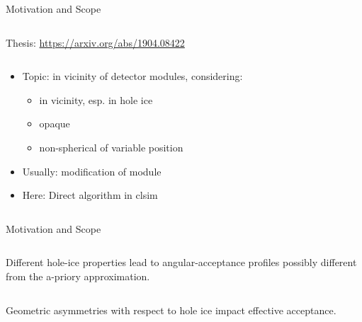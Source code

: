 
\begin{frame}[fragile]{Motivation and Scope}
  \begin{column}{0.6\textwidth}

    \vspace{1cm}
    Thesis: \url{https://arxiv.org/abs/1904.08422}
  \end{column}
  \begin{column}{0.4\textwidth}
    \begin{itemize}
      \item Topic:  in vicinity of detector modules, considering:
      \begin{itemize}
        \item {} in vicinity, esp. in hole ice
        \item opaque 
        \item non-spherical  of variable position
      \end{itemize}
      \item Usually:  modification of module 
      \item Here: Direct  algorithm in clsim
    \end{itemize}

    \vspace{2cm}

  \end{column}
\end{frame}

\begin{frame}[fragile]{Motivation and Scope}
  \begin{column}{0.5\textwidth}
    \vspace*{10mm} 
    
    \vspace*{5mm} Different hole-ice properties lead to angular-acceptance profiles possibly different from the a-priory approximation.

  \end{column}
  \begin{column}{0.5\textwidth}
    
    Geometric asymmetries with respect to hole ice impact effective acceptance.

  \end{column}
\end{frame}

